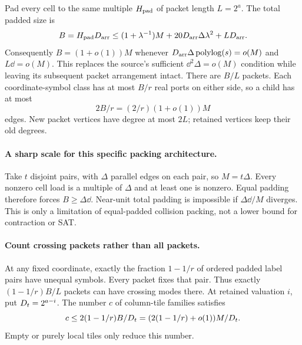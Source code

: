 Pad every cell to the same multiple $H_{\rm pad}$ of packet length $L=2^a$.
The total padded size is
\begin{equation}\label{eq:padding}
 B=H_{\rm pad}D_{\rm arr}
 \le(1+\lambda^{-1})M+20D_{\rm arr}\Delta\lambda^2+LD_{\rm arr}.
\end{equation}
Consequently $B=(1+o(1))M$ whenever
$D_{\rm arr}\Delta\operatorname{polylog}(s)=o(M)$ and $L\dd=o(M)$.
This replaces the source's sufficient $\dd^2\Delta=o(M)$ condition while leaving its
subsequent packet arrangement intact. There are $B/L$ packets. Each coordinate-symbol
class has at most $B/r$ real ports on either side, so a child has at most
\[
 2B/r=(2/r)(1+o(1))M
\]
edges. New packet vertices have degree at most $2L$; retained vertices keep their old degrees.

\paragraph{A sharp scale for this specific packing architecture.}
Take $t$ disjoint pairs, with $\Delta$ parallel edges on each pair, so $M=t\Delta$.
Every nonzero cell load is a multiple of $\Delta$ and at least one is nonzero.
Equal padding therefore forces $B\ge\Delta\dd$. Near-unit total padding is impossible
if $\Delta\dd/M$ diverges. This is only a limitation of equal-padded collision packing,
not a lower bound for contraction or SAT.

\paragraph{Count crossing packets rather than all packets.}
At any fixed coordinate, exactly the fraction $1-1/r$ of ordered padded label pairs
have unequal symbols. Every packet fixes that pair. Thus exactly
$(1-1/r)B/L$ packets can have crossing modes there. At retained valuation $i$, put
$D_t=2^{a-i}$. The number $c$ of column-tile families satisfies
\begin{equation}\label{eq:families}
 c\le2(1-1/r)B/D_t=(2(1-1/r)+o(1))M/D_t.
\end{equation}
Empty or purely local tiles only reduce this number.

